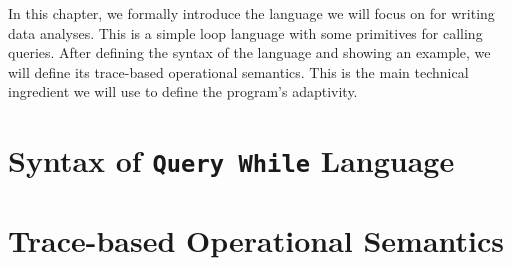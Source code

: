 In this chapter, we formally introduce the language we will focus on for writing data analyses.  
This is a simple loop language with some primitives for calling queries. 
After defining the syntax of the language and showing an example, we will define its trace-based operational semantics. 
This is the main technical ingredient we will use to define the program's adaptivity.

\section{Syntax of {\tt Query While} Language}
\label{sec:language-syntax}

\section{Trace-based Operational Semantics}
\label{sec:language-os}

